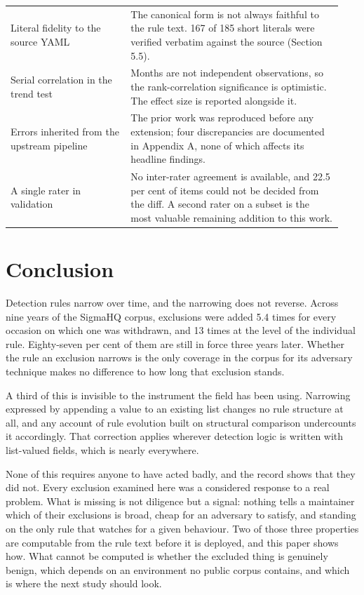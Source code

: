 \begin{table}[htbp]
\begin{tabular}{@{}p{0.34\linewidth}p{0.60\linewidth}@{}}
Literal fidelity to the source YAML & The canonical form is not always faithful to the rule text. 167 of 185 short literals were verified verbatim against the source (Section 5.5). \\
Serial correlation in the trend test & Months are not independent observations, so the rank-correlation significance is optimistic. The effect size is reported alongside it. \\
Errors inherited from the upstream pipeline & The prior work was reproduced before any extension; four discrepancies are documented in Appendix A, none of which affects its headline findings. \\
A single rater in validation & No inter-rater agreement is available, and 22.5 per cent of items could not be decided from the diff. A second rater on a subset is the most valuable remaining addition to this work. \\
\bottomrule
\end{tabular}
\end{table}

\FloatBarrier
\section{Conclusion}
\label{sec:conclusion}

Detection rules narrow over time, and the narrowing does not reverse. Across nine years of the SigmaHQ corpus, exclusions were added 5.4 times for every occasion on which one was withdrawn, and 13 times at the level of the individual rule. Eighty-seven per cent of them are still in force three years later. Whether the rule an exclusion narrows is the only coverage in the corpus for its adversary technique makes no difference to how long that exclusion stands.

A third of this is invisible to the instrument the field has been using. Narrowing expressed by appending a value to an existing list changes no rule structure at all, and any account of rule evolution built on structural comparison undercounts it accordingly. That correction applies wherever detection logic is written with list-valued fields, which is nearly everywhere.

None of this requires anyone to have acted badly, and the record shows that they did not. Every exclusion examined here was a considered response to a real problem. What is missing is not diligence but a signal: nothing tells a maintainer which of their exclusions is broad, cheap for an adversary to satisfy, and standing on the only rule that watches for a given behaviour. Two of those three properties are computable from the rule text before it is deployed, and this paper shows how. What cannot be computed is whether the excluded thing is genuinely benign, which depends on an environment no public corpus contains, and which is where the next study should look.

